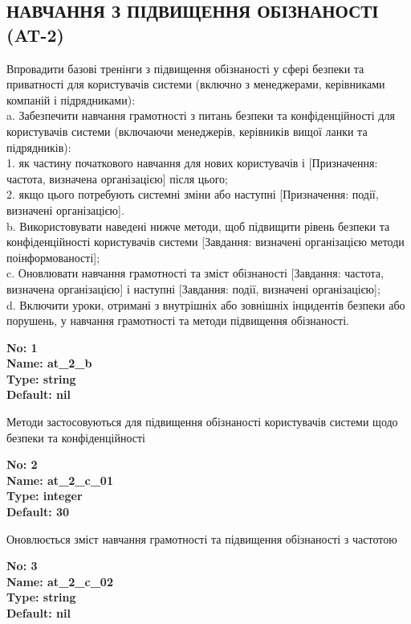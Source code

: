 \documentclass{article}
\begin{document}
\subsection{НАВЧАННЯ З ПІДВИЩЕННЯ ОБІЗНАНОСТІ (AT-2)}
Впровадити базові тренінги з підвищення обізнаності у сфері безпеки та приватності для користувачів системи (включно з менеджерами, керівниками компаній і підрядниками):\\ 
a. Забезпечити навчання грамотності з питань безпеки та конфіденційності для користувачів системи (включаючи менеджерів, керівників вищої ланки та підрядників):\\ 
1. як частину початкового навчання для нових користувачів і [Призначення: частота, визначена організацією] після цього;\\ 
2. якщо цього потребують системні зміни або наступні [Призначення: події, визначені організацією].\\ 
b. Використовувати наведені нижче методи, щоб підвищити рівень безпеки та конфіденційності користувачів системи [Завдання: визначені організацією методи поінформованості];\\ 
c. Оновлювати навчання грамотності та зміст обізнаності [Завдання: частота, визначена організацією] і наступні [Завдання: події, визначені організацією];\\ 
d. Включити уроки, отримані з внутрішніх або зовнішніх інцидентів безпеки або порушень, у навчання грамотності та методи підвищення обізнаності.

\vspace{10pt}
{\footnotesize\bfseries
No: 1\\
Name: at\_\allowbreak{}2\_\allowbreak{}b\\
Type: string\\
Default: nil
}

{\footnotesize Методи застосовуються для підвищення обізнаності користувачів системи щодо безпеки та конфіденційності}


{\footnotesize\bfseries
No: 2\\
Name: at\_\allowbreak{}2\_\allowbreak{}c\_\allowbreak{}01\\
Type: integer\\
Default: 30
}

{\footnotesize Оновлюється зміст навчання грамотності та підвищення обізнаності з частотою}


{\footnotesize\bfseries
No: 3\\
Name: at\_\allowbreak{}2\_\allowbreak{}c\_\allowbreak{}02\\
Type: string\\
Default: nil
}
\end{document}
